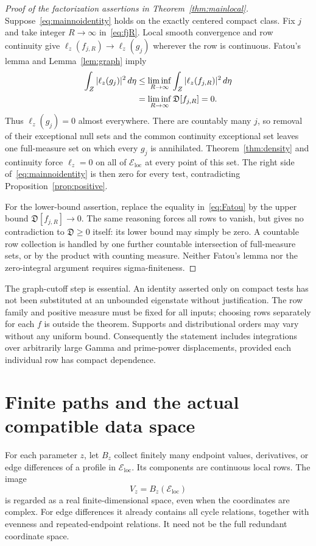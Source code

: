 \documentclass[11pt,a4paper]{article}
\numberwithin{equation}{section}
\theoremstyle{definition}
\theoremstyle{remark}
\newcommand{\Eloc}{\mathcal E_{\mathrm{loc}}}
\newcommand{\Def}{\mathfrak D}
\begin{document}
\begin{proof}[Proof of the factorization assertions in Theorem~\ref{thm:mainlocal}]
Suppose~\eqref{eq:mainnoidentity} holds on the exactly centered compact class. Fix $j$ and take integer $R\to\infty$ in~\eqref{eq:fjR}. Local smooth convergence and row continuity give
$\ell_z(f_{j,R})\to\ell_z(g_j)$ wherever the row is continuous. Fatou's lemma and Lemma~\ref{lem:graph} imply
\begin{align}\label{eq:Fatou}
 \int_Z|\ell_z(g_j)|^2\,d\eta
 &\le\liminf_{R\to\infty}\int_Z|\ell_z(f_{j,R})|^2\,d\eta\notag\\
 &=\liminf_{R\to\infty}\Def[f_{j,R}]=0.
\end{align}
Thus $\ell_z(g_j)=0$ almost everywhere. There are countably many $j$, so removal of their exceptional null sets and the common continuity exceptional set leaves one full-measure set on which every $g_j$ is annihilated. Theorem~\ref{thm:density} and continuity force $\ell_z=0$ on all of $\Eloc$ at every point of this set. The right side of~\eqref{eq:mainnoidentity} is then zero for every test, contradicting Proposition~\ref{prop:positive}.

For the lower-bound assertion, replace the equality in~\eqref{eq:Fatou} by the upper bound $\Def[f_{j,R}]\to0$. The same reasoning forces all rows to vanish, but gives no contradiction to $\Def\ge0$ itself: its lower bound may simply be zero. A countable row collection is handled by one further countable intersection of full-measure sets, or by the product with counting measure. Neither Fatou's lemma nor the zero-integral argument requires sigma-finiteness.
\end{proof}

The graph-cutoff step is essential. An identity asserted only on compact tests has not been substituted at an unbounded eigenstate without justification. The row family and positive measure must be fixed for all inputs; choosing rows separately for each $f$ is outside the theorem. Supports and distributional orders may vary without any uniform bound. Consequently the statement includes integrations over arbitrarily large Gamma and prime-power displacements, provided each individual row has compact dependence.

\section{Finite paths and the actual compatible data space}\label{sec:paths}

For each parameter $z$, let $B_z$ collect finitely many endpoint values, derivatives, or edge differences of a profile in $\Eloc$. Its components are continuous local rows. The image
\[
 V_z=B_z(\Eloc)
\]
is regarded as a real finite-dimensional space, even when the coordinates are complex. For edge differences it already contains all cycle relations, together with evenness and repeated-endpoint relations. It need not be the full redundant coordinate space.
\end{document}
